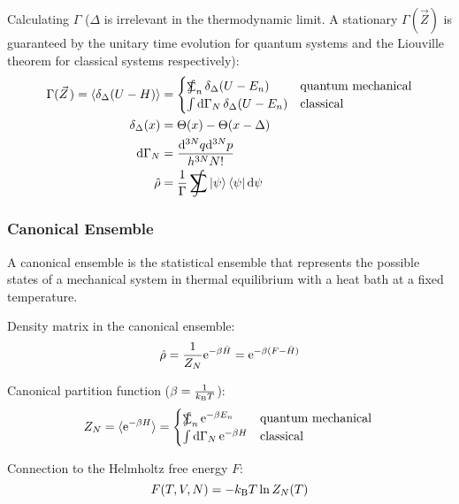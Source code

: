 			\noindent
			Calculating $\Gamma$ ($\Delta$ is irrelevant in the thermodynamic limit. A stationary $\Gamma(\vec{Z})$ is guaranteed by the unitary time evolution for quantum systems and the Liouville theorem for classical systems respectively):
			\begin{equation}
				\begin{aligned}
					\Gamma(\vec{Z}) = \langle \delta_\Delta (U-H) \rangle
					&= \begin{cases}
						\SumInt_n \delta_\Delta(U-E_n) & \text{quantum mechanical} \\
						\int \dd \Gamma_N \, \delta_\Delta(U-E_n) & \text{classical}
					\end{cases} \\
					\delta_\Delta(x) &= \Theta(x) - \Theta(x-\Delta)\\
					\dd \Gamma_N &= \frac{\dd^{3N}q \dd^{3N}p }{h^{3N} N!} \\
					\hat{\rho} &= \frac{1}{\Gamma} \SumInt \Ket{\psi}\Bra{\psi}\dd{\psi}
				\end{aligned}
			\end{equation}

		\subsubsection{Canonical Ensemble}
			A canonical ensemble is the statistical ensemble that represents the possible states of a mechanical system in thermal equilibrium with a heat bath at a fixed temperature.

			Density matrix in the canonical ensemble:
			\begin{equation}
				\hat{\rho} = \frac{1}{Z_N} \mathrm{e}^{-\beta \hat{H}} = \mathrm{e}^{-\beta (F-\hat{H})}
			\end{equation}

			\noindent
			Canonical partition function ($\beta = \frac{1}{k_{\text{B}} T}$):
			\begin{equation}
				Z_N=\langle \ex^{-\beta H} \rangle
				= \begin{cases}
					\SumInt_n \ex^{-\beta E_n} & \text{quantum mechanical} \\
					\int \dd \Gamma_N \, \ex^{-\beta H} & \text{classical}
				\end{cases} \\
			\end{equation}

			\noindent
			Connection to the Helmholtz free energy $F$:
			\begin{equation}
				F(T, V, N) = -k_{\text{B}} T \ln{Z_N(T)}
			\end{equation}


